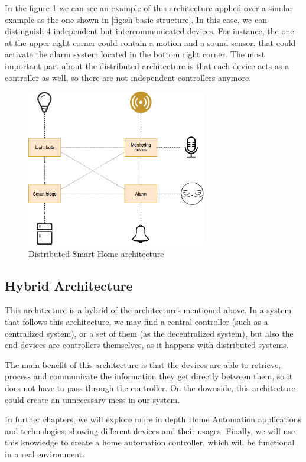 In the figure \ref{fig:distributed-sh-architecture} we can see an example of this architecture applied over a similar example as the one
shown in \ref{fig:sh-basic-structure}. In this case, we can distinguish 4 independent but intercommunicated devices. For instance,
the one at the upper right corner could contain a motion and a sound sensor, that could activate the alarm system located in the bottom
right corner. The most important part about the distributed architecture is that each device acts as a controller as well, so there are not
independent controllers anymore.

\begin{figure}
	\centering
	\includegraphics[width=0.7\textwidth]{images/Chapter_02/distributed-sh-architecture.png}
	\caption{Distributed Smart Home architecture}
	\label{fig:distributed-sh-architecture}
\end{figure}

\subsection{Hybrid Architecture}
This architecture is a hybrid of the architectures mentioned above. In a system that follows this architecture, we may find
a central controller (such as a centralized system), or a set of them (as the decentralized system), but also the end devices are
controllers themselves, as it happens with distributed systems.

The main benefit of this architecture is that the devices are able to retrieve, process and communicate the information they get
directly between them, so it does not have to pass through the controller. On the downside, this architecture could create an
unnecessary mess in our system.

\bigskip
In further chapters, we will explore more in depth Home Automation applications and technologies, showing different devices and
their usages. Finally, we will use this knowledge to create a home automation controller, which will be functional in a real environment.
